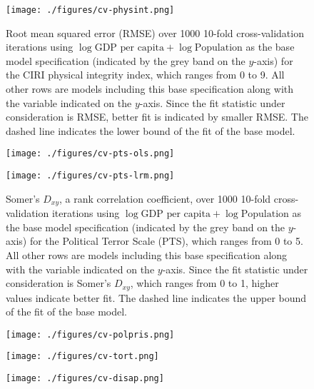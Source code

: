 \documentclass[12pt]{article}
\begin{document}
\begin{figure}[!htpb]
\centering
\texttt{[image: ./figures/cv-physint.png]}
\caption{Root mean squared error (RMSE) over 1000 10-fold cross-validation iterations using $\log \text{GDP per capita} + \log \text{Population}$ as the base model specification (indicated by the grey band on the $y$-axis) for the CIRI physical integrity index, which ranges from 0 to 9. All other rows are models including this base specification along with the variable indicated on the $y$-axis. Since the fit statistic under consideration is RMSE, better fit is indicated by smaller RMSE. The dashed line indicates the lower bound of the fit of the base model.}
\label{fig:cv-physint}
\end{figure}

\begin{figure}[!htpb]
\centering
\texttt{[image: ./figures/cv-pts-ols.png]}
\caption{}
\label{fig:cv-pts-ols}
\end{figure}

\begin{figure}[!htpb]
\centering
\texttt{[image: ./figures/cv-pts-lrm.png]}
\caption{Somer's $D_{xy}$, a rank correlation coefficient, over 1000 10-fold cross-validation iterations using $\log \text{GDP per capita} + \log \text{Population}$ as the base model specification (indicated by the grey band on the $y$-axis) for the Political Terror Scale (PTS), which ranges from 0 to 5. All other rows are models including this base specification along with the variable indicated on the $y$-axis. Since the fit statistic under consideration is Somer's $D_{xy}$, which ranges from 0 to 1, higher values indicate better fit. The dashed line indicates the upper bound of the fit of the base model.}
\label{fig:cv-pts-lrm}
\end{figure}

\begin{figure}[!htpb]
\centering
\texttt{[image: ./figures/cv-polpris.png]}
\caption{}
\label{fig:cv-polpris}
\end{figure}

\begin{figure}[!htpb]
\centering
\texttt{[image: ./figures/cv-tort.png]}
\caption{}
\label{fig:cv-tort}
\end{figure}

\begin{figure}[!htpb]
\centering
\texttt{[image: ./figures/cv-disap.png]}
\caption{}
\label{fig:cv-disap}
\end{figure}
\end{document}
